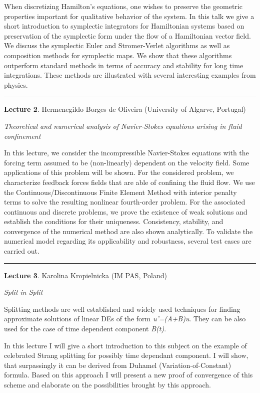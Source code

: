 \documentclass[
]{article}
\begin{document}
When discretizing Hamilton's equations, one wishes to preserve the
geometric properties important for qualitative behavior of the system.
In this talk we give a short introduction to symplectic integrators for
Hamiltonian systems based on preservation of the symplectic form under
the flow of a Hamiltonian vector field. We discuss the symplectic Euler
and Stromer-Verlet algorithms as well as composition methods for
symplectic maps. We show that these algorithms outperform standard
methods in terms of accuracy and stability for long time integrations.
These methods are illustrated with several interesting examples from
physics.

\begin{center}\rule{0.5\linewidth}{0.5pt}\end{center}

\textbf{Lecture 2}. Hermenegildo Borges de Oliveira (University of
Algarve, Portugal)

\emph{Theoretical and numerical analysis of Navier-Stokes equations
arising in fluid confinement}

In this lecture, we consider the incompressible Navier-Stokes equations
with the forcing term assumed to be (non-linearly) dependent on the
velocity field. Some applications of this problem will be shown. For the
considered problem, we characterize feedback forces fields that are able
of confining the fluid flow. We use the Continuous/Discontinuous Finite
Element Method with interior penalty terms to solve the resulting
nonlinear fourth-order problem. For the associated continuous and
discrete problems, we prove the existence of weak solutions and
establish the conditions for their uniqueness. Consistency, stability,
and convergence of the numerical method are also shown analytically. To
validate the numerical model regarding its applicability and robustness,
several test cases are carried out.

\begin{center}\rule{0.5\linewidth}{0.5pt}\end{center}

\textbf{Lecture 3}. Karolina Kropielnicka (IM PAS, Poland)

\emph{Split in Split}

Splitting methods are well established and widely used techniques for
finding approximate solutions of linear DEs of the form
\emph{u'=(A+B)u}. They can be also used for the case of time dependent
component \emph{B(t)}.

In this lecture I will give a short introduction to this subject on the
example of celebrated Strang splitting for possibly time dependant
component. I will show, that surpassingly it can be derived from Duhamel
(Variation-of-Constant) formula. Based on this approach I will present a
new proof of convergence of this scheme and elaborate on the
possibilities brought by this approach.
\end{document}
